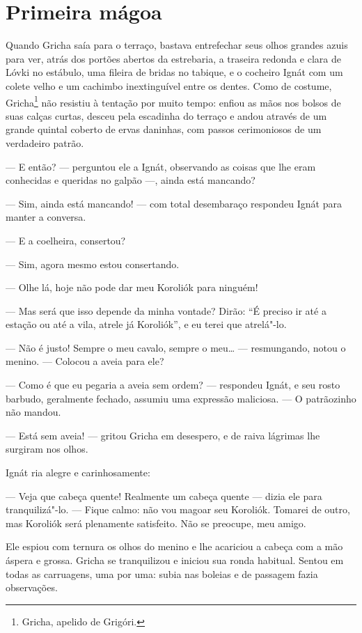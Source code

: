 \chapter{Primeira mágoa} \label{part9}

Quando Gricha saía para o terraço, bastava entrefechar seus olhos
grandes azuis para ver, atrás dos portões abertos da estrebaria, a
traseira redonda e clara de Lóvki no estábulo, uma fileira de bridas no
tabique, e o cocheiro Ignát com um colete velho e um cachimbo
inextinguível entre os dentes. Como de costume, Gricha\footnote{Gricha, apelido de Grigóri.} não resistiu à
tentação por muito tempo: enfiou as mãos nos bolsos de suas calças
curtas, desceu pela escadinha do terraço e andou através de um grande
quintal coberto de ervas daninhas, com passos cerimoniosos de um
verdadeiro patrão.

--- E então? --- perguntou ele a Ignát, observando as coisas que lhe
eram conhecidas e queridas no galpão ---, ainda está mancando?

--- Sim, ainda está mancando! --- com total desembaraço respondeu Ignát
para manter a conversa.

--- E a coelheira, consertou?

--- Sim, agora mesmo estou consertando.

--- Olhe lá, hoje não pode dar meu Koroliók para ninguém!

--- Mas será que isso depende da minha vontade? Dirão: ``É preciso ir
até a estação ou até a vila, atrele já Koroliók'', e eu terei que
atrelá"-lo.

--- Não é justo! Sempre o meu cavalo, sempre o meu\ldots{} --- resmungando,
notou o menino. --- Colocou a aveia para ele?

--- Como é que eu pegaria a aveia sem ordem? --- respondeu Ignát, e seu
rosto barbudo, geralmente fechado, assumiu uma expressão maliciosa. ---
O patrãozinho não mandou.

--- Está sem aveia! --- gritou Gricha em desespero, e de raiva lágrimas
lhe surgiram nos olhos.

Ignát ria alegre e carinhosamente:

--- Veja que cabeça quente! Realmente um cabeça quente --- dizia ele
para tranquilizá"-lo. --- Fique calmo: não vou magoar seu Koroliók.
Tomarei de outro, mas Koroliók será plenamente satisfeito. Não se
preocupe, meu amigo.

Ele espiou com ternura os olhos do menino e lhe acariciou a cabeça com a
mão áspera e grossa. Gricha se tranquilizou e iniciou sua ronda
habitual. Sentou em todas as carruagens, uma por uma: subia nas boleias
e de passagem fazia observações.

